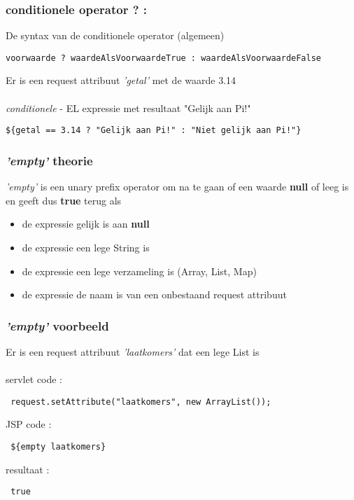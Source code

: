 \documentclass{beamer}
\begin{document}
\begin{frame}[fragile]

\frametitle{conditionele operator \textbf{? :}}

De syntax van de conditionele operator (algemeen)
{\small
\begin{verbatim}voorwaarde ? waardeAlsVoorwaardeTrue : waardeAlsVoorwaardeFalse\end{verbatim}
}

Er is een request attribuut \textit{'getal'} met de waarde 3.14\\~\\

\textit{conditionele} - EL expressie met resultaat "Gelijk aan Pi!"
\begin{verbatim}${getal == 3.14 ? "Gelijk aan Pi!" : "Niet gelijk aan Pi!"}\end{verbatim}

\end{frame}


\begin{frame}

\frametitle{\textit{'empty'} theorie}

{\large \textit{'empty'} is een unary prefix operator om na te gaan of een waarde \textbf{null} of leeg is en geeft dus \textbf{true} terug als 

\begin{itemize}
  \item de expressie gelijk is aan \textbf{null}
  \item de expressie een lege String is
  \item de expressie een lege verzameling is (Array, List, Map)
  \item de expressie de naam is van een onbestaand request attribuut
\end{itemize}}

\end{frame}


\begin{frame}[fragile]

\frametitle{\textit{'empty'} voorbeeld}

{\large Er is een request attribuut \textit{'laatkomers'} dat een lege List is\\~\\

servlet code :

\begin{verbatim} request.setAttribute("laatkomers", new ArrayList()); \end{verbatim}

JSP code :

\begin{verbatim} ${empty laatkomers} \end{verbatim}

resultaat :

\begin{verbatim} true \end{verbatim}
}

\end{frame}
\end{document}

